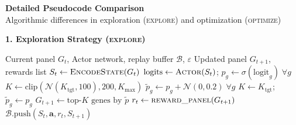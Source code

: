 \documentclass[8pt]{article}
\begin{document}
\newpage

\begin{center}
{\large\bfseries Detailed Pseudocode Comparison}\\[3pt]
{\normalsize Algorithmic differences in exploration (\textsc{explore}) and optimization (\textsc{optimize})}
\end{center}
\vspace{4pt}

{\large\bfseries 1. Exploration Strategy (\textsc{explore})}

\vspace{3pt}

\begin{tcolorbox}[
    title={\textbf{Algorithm 1a:} Original RL --- $\varepsilon$-greedy per-gene sampling},
    colback=white, colframe=black!60, fonttitle=\small\bfseries,
    boxrule=0.5pt, arc=2pt, left=4pt, right=4pt, top=2pt, bottom=2pt
]
\begin{algorithmic}[1]
\small
\Require Current panel $G_t$, Actor network, replay buffer $\mathcal{B}$, $\varepsilon$
\Ensure Updated panel $G_{t+1}$, rewards list
    \State $S_t \gets \textsc{EncodeState}(G_t)$ 
    \State $\text{logits} \gets \textsc{Actor}(S_t)$; \quad $p_g \gets \sigma(\text{logit}_g) \;\forall g$
     
        \State $K \gets \text{clip}(\mathcal{N}(K_\text{tgt}, 100), 200, K_\text{max})$
        \State $\tilde{p}_g \gets p_g + \mathcal{N}(0, 0.2) \;\forall g$
    \Else
        \State $K \gets K_\text{tgt}$; \quad $\tilde{p}_g \gets p_g$
    \EndIf
    \State $G_{t+1} \gets \text{top-}K \text{ genes by } \tilde{p}$
    \State $r_t \gets \textsc{reward\_panel}(G_{t+1})$ 
    \State $\mathcal{B}.\text{push}(S_t, \mathbf{a}, r_t, S_{t+1})$
\EndFor
\end{algorithmic}
\end{tcolorbox}

\vspace{4pt}
\end{document}
